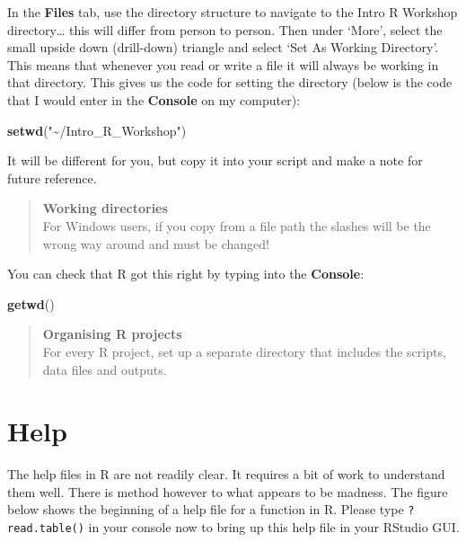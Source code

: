 \documentclass[
]{book}
\newenvironment{Shaded}{\begin{snugshade}}{\end{snugshade}}
\newcommand{\KeywordTok}[1]{\textcolor[rgb]{0.13,0.29,0.53}{\textbf{#1}}}
\newcommand{\NormalTok}[1]{#1}
\newcommand{\StringTok}[1]{\textcolor[rgb]{0.31,0.60,0.02}{#1}}
\begin{document}
In the \textbf{Files} tab, use the directory structure to navigate to the Intro R Workshop directory\ldots{} this will differ from person to person. Then under `More', select the small upside down (drill-down) triangle and select `Set As Working Directory'. This means that whenever you read or write a file it will always be working in that directory. This gives us the code for setting the directory (below is the code that I would enter in the \textbf{Console} on my computer):

\begin{Shaded}
\begin{Highlighting}[]
\KeywordTok{setwd}\NormalTok{(}\StringTok{"\textasciitilde{}/Intro\_R\_Workshop"}\NormalTok{)}
\end{Highlighting}
\end{Shaded}

It will be different for you, but copy it into your script and make a note for future reference.

\begin{quote}
\textbf{Working directories}\\
For Windows users, if you copy from a file path the slashes will be the wrong way around and must be changed!
\end{quote}

You can check that R got this right by typing into the \textbf{Console}:

\begin{Shaded}
\begin{Highlighting}[]
\KeywordTok{getwd}\NormalTok{()}
\end{Highlighting}
\end{Shaded}

\begin{quote}
\textbf{Organising R projects}\\
For every R project, set up a separate directory that includes the scripts, data files and outputs.
\end{quote}

\hypertarget{help}{%
\section{Help}\label{help}}

The help files in R are not readily clear. It requires a bit of work to understand them well. There is method however to what appears to be madness. The figure below shows the beginning of a help file for a function in R. Please type \texttt{?read.table()} in your console now to bring up this help file in your RStudio GUI.
\end{document}
